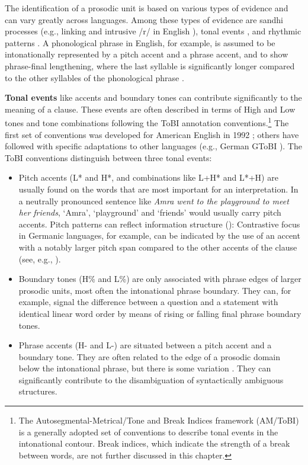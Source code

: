 \documentclass[output=paper,hidelinks]{langscibook}
\begin{document}
\z

\noindent The identification of a prosodic unit is based on various types of evidence and can vary greatly across languages. Among these types of evidence are sandhi processes (e.g., linking and intrusive /r/ in English \citep{Wells1970}), tonal events \citep[e.g.,][]{BeckmanPierrehumbert1986, PierrehumbertBeckman1988}, and rhythmic patterns \citep[e.g.,][]{Liberman1975, NesporVogel1989}. A phonological phrase in English, for example, is assumed to be intonationally represented by a pitch accent and a phrase accent, and to show phrase-final lengthening, where the last syllable is significantly longer compared to the other syllables of the phonological phrase \citep{Lehisteetal1976, Frota2012}. 

{\bf Tonal events} like accents and boundary tones can contribute significantly to the meaning of a clause. These events are often described in terms of High and Low tones and tone combinations following the ToBI annotation conventions.\footnote{The Autosegmental-Metrical/Tone and Break Indices framework (AM/ToBI) \citep{Pierrehumbert1980, Silvermanetal1992, Beckmanetal2005} is a generally adopted set of conventions to describe tonal events in the intonational contour. Break indices, which indicate the strength of a break between words, are not further discussed in this chapter.} The first set of conventions was developed for American English in 1992 \citep{Silvermanetal1992}; others have followed with specific adaptations to other languages (e.g., German GToBI \citep{GriceBaumann2002}). The ToBI conventions distinguish between three tonal events: 
\begin{itemize}
\item Pitch accents (L* and H*, and combinations like L+H* and L*+H) are usually found on the words that are most important for an interpretation. In a neutrally pronounced sentence like {\em Amra went to the playground to meet her friends}, `Amra', `playground' and `friends' would usually carry pitch accents. Pitch patterns can reflect information structure  ():
Contrastive focus in Germanic languages, for example, can be indicated by the use of an accent with a notably larger pitch span compared to the other accents of the clause (see, e.g., \citealt{Fery2020}).

\item Boundary tones (H\% and L\%) are only associated with phrase edges of larger prosodic units, most often the intonational phrase boundary. They can, for example, signal the difference between a  question and a statement with identical linear word order by means of rising or falling final phrase boundary tones.

\item Phrase accents (H- and L-) are situated between a pitch accent and a boundary tone. They are often related to the edge of a prosodic domain below the intonational phrase, but there is some variation \citep[see the discussion in][]{Griceetal2000}. They can significantly contribute to the disambiguation of syntactically ambiguous structures.
\end{itemize}
\end{document}
